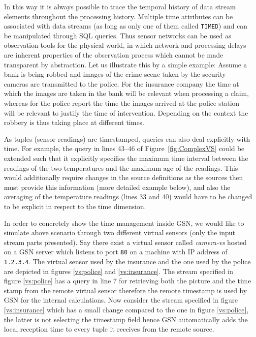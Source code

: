 In this way it is always possible to trace the temporal history of
data stream elements throughout the processing history.  Multiple time
attributes can be associated with data streams (as long as only one of them called \texttt{TIMED})
and can be manipulated through SQL queries. Thus sensor networks can be used as observation
tools for the physical world, in which network and processing delays
are inherent properties of the observation process which cannot be
made transparent by abstraction.  Let us illustrate this by a simple
example: Assume a bank is being robbed and images of the crime scene
taken by the security cameras are transmitted to the police. For the
insurance company the time at which the images are taken in the bank
will be relevant when processing a claim, whereas for the police
report the time the images arrived at the police station will be
relevant to justify the time of intervention. Depending on the context
the robbery is thus taking place at different times.

As tuples (sensor readings) are timestamped, queries can also deal
explicitly with time. For example, the query in lines 43--46 of
Figure~\ref{fig:ComplexVS} could be extended such that it explicitly
specifies the maximum time interval between the readings of the two
temperatures and the maximum age of the readings. This would
additionally require changes in the source definitions as the
sources then must provide this information (more detailed example below), and also the
averaging of the temperature readings (lines 33 and 40) would have to
be changed to be explicit in respect to the time dimension.

In order to concretely show the time management inside GSN, we would like to
simulate above scenario through two different virtual sensors (only the input stream parts presented).
Say there exist a virtual sensor called \emph{camera-vs} hosted on a GSN server which listens to port \texttt{80} on a machine with IP address of \texttt{1.2.3.4}.
The virtual sensor used by the insurance and the one used by the police are depicted in figures \ref{vs:police} and \ref{vs:insurance}.
The stream specified in figure \ref{vs:police} has a query in line 7 for retrieving both the picture and the time stamp from the remote virtual sensor therefore
the remote timestamp is used by GSN for the internal calculations. Now consider the stream specified in figure \ref{vs:insurance} which has a small change compared to the one in figure \ref{vs:police}, the latter is not selecting the timestamp field hence GSN automatically adds the local reception time to every tuple it receives from the remote source.

